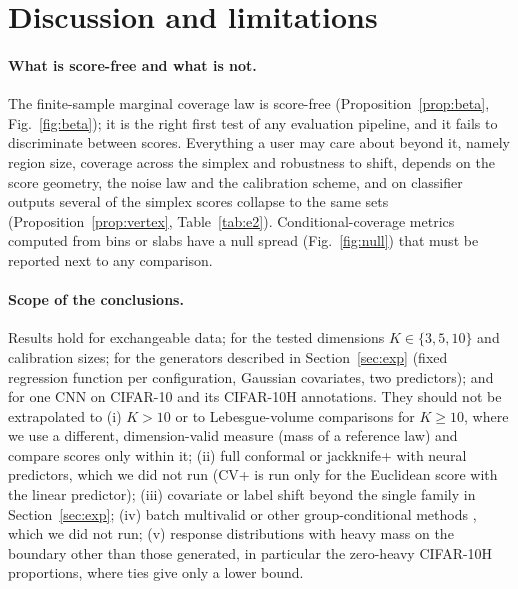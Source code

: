 \section{Discussion and limitations}\label{sec:disc}
\paragraph{What is score-free and what is not.} The finite-sample marginal coverage law is score-free (Proposition~\ref{prop:beta}, Fig.~\ref{fig:beta}); it is the right first test of any evaluation pipeline, and it fails to discriminate between scores. Everything a user may care about beyond it, namely region size, coverage across the simplex and robustness to shift, depends on the score geometry, the noise law and the calibration scheme, and on classifier outputs several of the simplex scores collapse to the same sets (Proposition~\ref{prop:vertex}, Table~\ref{tab:e2}). Conditional-coverage metrics computed from bins or slabs have a null spread (Fig.~\ref{fig:null}) that must be reported next to any comparison.

\paragraph{Scope of the conclusions.} Results hold for exchangeable data; for the tested dimensions $K\in\{3,5,10\}$ and calibration sizes; for the generators described in Section~\ref{sec:exp} (fixed regression function per configuration, Gaussian covariates, two predictors); and for one CNN on CIFAR-10 and its CIFAR-10H annotations. They should not be extrapolated to (i) $K>10$ or to Lebesgue-volume comparisons for $K\ge 10$, where we use a different, dimension-valid measure (mass of a reference law) and compare scores only within it; (ii) full conformal or jackknife+ with neural predictors, which we did not run (CV+ is run only for the Euclidean score with the linear predictor); (iii) covariate or label shift beyond the single family in Section~\ref{sec:exp}; (iv) batch multivalid or other group-conditional methods \citep{jung2023batch}, which we did not run; (v) response distributions with heavy mass on the boundary other than those generated, in particular the zero-heavy CIFAR-10H proportions, where ties give only a lower bound.

